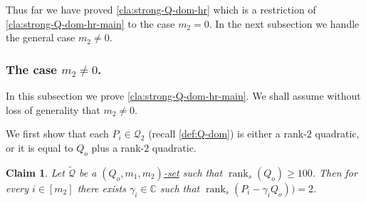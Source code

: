 \documentclass[10pt,a4paper]{article}
\newtheorem{claim}[theorem]{Claim}
\def\rank{\operatorname{rank}}
\renewcommand{\C}{\mathbb{C}}
\newcommand{\cQ}{{\mathcal{Q}}}
\newcommand{\rkq}{100}
\begin{document}
Thus far we have proved  \autoref{cla:strong-Q-dom-hr} which is a restriction of  \autoref{cla:strong-Q-dom-hr-main} to the case $m_2=0$. In the next subsection we handle the general case $m_2\neq 0$.

\subsubsection{The case $m_2\neq 0$.}

In this subsection we prove  \autoref{cla:strong-Q-dom-hr-main}.
We shall assume  without loss of generality that $m_2\neq 0$.

We first show that each $P_i \in \cQ_2$ (recall \autoref{def:Q-dom}) is either a rank-$2$ quadratic, or it is equal to $Q_o$ plus a rank-$2$ quadratic.

\begin{claim}\label{cla:no-rank-3}
Let $\tilde{\cQ}$ be a \hyperref[def:Q-dom]{$(Q_o,m_1,m_2)$-set} such that $\rank_s(Q_o)\geq \rkq$. Then for every $i \in [m_2]$ there exists $\gamma_i\in \C$  such that $\rank_s(P_i-\gamma_i Q_o)) = 2$.
\end{claim}
\end{document}
